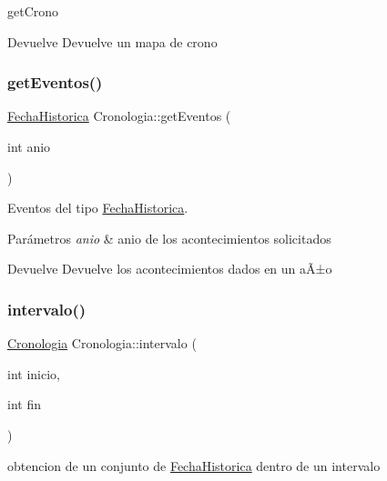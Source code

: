 get\+Crono 

\begin{DoxyReturn}{Devuelve}
Devuelve un mapa de crono 
\end{DoxyReturn}
\mbox{\label{classCronologia_a45780b1afa95d9c0ca0c4cdd72180114}} 
\subsubsection{\texorpdfstring{get\+Eventos()}{getEventos()}}
{\footnotesize\ttfamily \hyperlink{classFechaHistorica}{Fecha\+Historica} Cronologia\+::get\+Eventos (\begin{DoxyParamCaption}\item[{int}]{anio }\end{DoxyParamCaption})}



Eventos del tipo \hyperlink{classFechaHistorica}{Fecha\+Historica}. 


\begin{DoxyParams}{Parámetros}
{\em anio} & anio de los acontecimientos solicitados \\
\hline
\end{DoxyParams}
\begin{DoxyReturn}{Devuelve}
Devuelve los acontecimientos dados en un aÃ±o 
\end{DoxyReturn}
\mbox{\label{classCronologia_acd418bfc323c6fbac776419bddac74e8}} 
\subsubsection{\texorpdfstring{intervalo()}{intervalo()}}
{\footnotesize\ttfamily \hyperlink{classCronologia}{Cronologia} Cronologia\+::intervalo (\begin{DoxyParamCaption}\item[{int}]{inicio,  }\item[{int}]{fin }\end{DoxyParamCaption})}



obtencion de un conjunto de \hyperlink{classFechaHistorica}{Fecha\+Historica} dentro de un intervalo 


